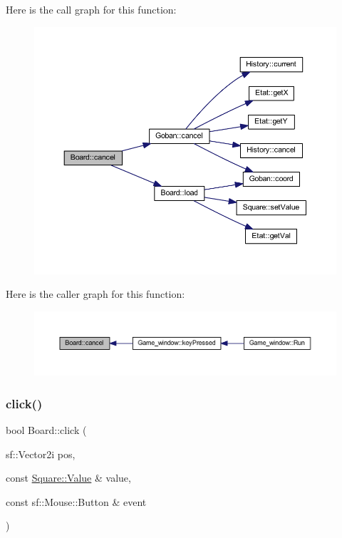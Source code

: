 Here is the call graph for this function\+:\nopagebreak
\begin{figure}[H]
\begin{center}
\leavevmode
\includegraphics[width=350pt]{class_board_ac7ec911a62371650afd340d1535a1742_cgraph}
\end{center}
\end{figure}
Here is the caller graph for this function\+:\nopagebreak
\begin{figure}[H]
\begin{center}
\leavevmode
\includegraphics[width=350pt]{class_board_ac7ec911a62371650afd340d1535a1742_icgraph}
\end{center}
\end{figure}
\mbox{\label{class_board_a5fda73da080403d8a71a8593d581c350}} 
\subsubsection{\texorpdfstring{click()}{click()}}
{\footnotesize\ttfamily bool Board\+::click (\begin{DoxyParamCaption}\item[{sf\+::\+Vector2i}]{pos,  }\item[{const \hyperlink{class_square_a7feeec236c037a9849114226adaa4ecc}{Square\+::\+Value} \&}]{value,  }\item[{const sf\+::\+Mouse\+::\+Button \&}]{event }\end{DoxyParamCaption})}

